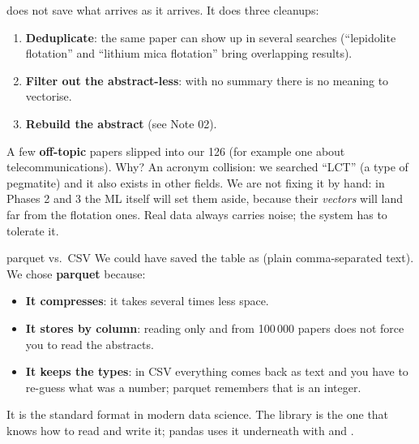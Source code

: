 \documentclass[11pt,a4paper]{article}
\begin{document}
 does not save what arrives as it arrives. It does three cleanups:
\begin{enumerate}
  \item \textbf{Deduplicate}: the same paper can show up in several searches (``lepidolite
        flotation'' and ``lithium mica flotation'' bring overlapping results).
  \item \textbf{Filter out the abstract-less}: with no summary there is no meaning to vectorise.
  \item \textbf{Rebuild the abstract} (see Note 02).
\end{enumerate}

\begin{ojo}
A few \textbf{off-topic} papers slipped into our 126 (for example one about
telecommunications). Why? An acronym collision: we searched ``LCT'' (a type of pegmatite) and
it also exists in other fields. We are not fixing it by hand: in Phases 2 and 3 the ML itself
will set them aside, because their \emph{vectors} will land far from the flotation ones. Real
data always carries noise; the system has to tolerate it.
\end{ojo}

\begin{concepto}{parquet vs.\ CSV}
We could have saved the table as  (plain comma-separated text). We chose
\textbf{parquet} because:
\begin{itemize}
  \item \textbf{It compresses}: it takes several times less space.
  \item \textbf{It stores by column}: reading only  and  from
        100\,000 papers does not force you to read the abstracts.
  \item \textbf{It keeps the types}: in CSV everything comes back as text and you have to
        re-guess what was a number; parquet remembers that  is an integer.
\end{itemize}
It is the standard format in modern data science. The  library is the one
that knows how to read and write it; pandas uses it underneath with
 and .
\end{concepto}
\end{document}
